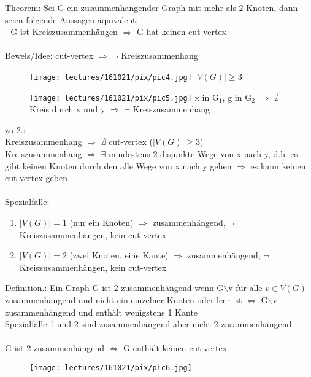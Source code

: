 \underline{Theorem:} Sei G ein zusammenhängender Graph mit mehr als 2 Knoten, dann seien folgende Aussagen äquivalent:\\
 - G ist Kreiszusammenhängen $\Rightarrow$ G hat keinen cut-vertex
\\\\
\underline{Beweis/Idee:}
cut-vertex $\Rightarrow$ $\neg$ Kreiszusammenhang
\begin{figure}[htp]
\centering
\texttt{[image: lectures/161021/pix/pic4.jpg]}
$|V(G)| \geq 3$
\end{figure}

\begin{figure}[htp]
\centering
\texttt{[image: lectures/161021/pix/pic5.jpg]}
x in G$_1$, g in G$_2$ $\Rightarrow$ $\nexists$ Kreis durch x und y $\Rightarrow$ $\neg$ Kreiszusammenhang
\end{figure}

\newpage
\underline{zu 2.:}\\
Kreiszusammenhang $\Rightarrow$ $\nexists$ cut-vertex ($|V(G)| \geq 3$)\\
Kreiszusammenhang $\Rightarrow$ $\exists$ mindestens 2 disjunkte Wege von x nach y, d.h. es gibt keinen Knoten durch den alle Wege von x nach y gehen $\Rightarrow$ es kann keinen cut-vertex geben
\\\\
\underline{Spezialfälle:}\\
\begin{enumerate}
	\item $|V(G)| = 1$ (nur ein Knoten) $\Rightarrow$ zusammenhängend, $\neg$ Kreiszusammenhängen, kein cut-vertex
	\item $|V(G)| = 2$ (zwei Knoten, eine Kante) $\Rightarrow$ zusammenhängend, $\neg$ Kreiszusammenhängen, kein cut-vertex
\end{enumerate}

\underline{Definition.:} Ein Graph G ist 2-zusammenhängend wenn G$\backslash$v für alle $v \in V(G)$ zusammenhängend und nicht ein einzelner Knoten oder leer ist $\Leftrightarrow$ G$\backslash$v zusammenhängend und enthält wenigstens 1 Kante\\

Spezialfälle 1 und 2 sind zusammenhängend aber nicht 2-zusammenhängend
\\\\
G ist 2-zusammenhängend $\Leftrightarrow$ G enthält keinen cut-vertex
\begin{figure}[htp]
\centering
\texttt{[image: lectures/161021/pix/pic6.jpg]}
\end{figure}

